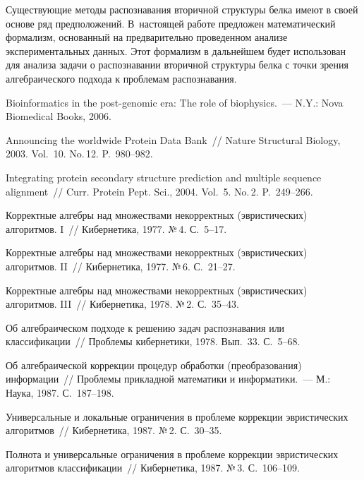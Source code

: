 \begin{multicols}{2}
Существующие методы распознавания вторичной структуры белка имеют в 
своей основе ряд предположений. В~настоящей работе предложен 
математический формализм, основанный на предварительно проведенном 
анализе экспериментальных данных. Этот формализм в дальнейшем будет 
использован для анализа задачи о распознавании вторичной структуры белка с 
точки зрения ал\-геб\-раи\-че\-ско\-го подхода к проблемам распознавания. 

{\small\frenchspacing
{\baselineskip=11.8pt
\begin{thebibliography}{99}

Bioinformatics in the post-genomic era: The role of biophysics.~--- N.Y.: Nova 
Biomedical Books, 2006. %

Announcing the worldwide Protein Data Bank~// Nature Structural Biology, 2003. 
Vol.~10. No.\,12. P.~980--982.

Integrating protein secondary structure prediction and multiple sequence alignment~// 
Curr. Protein Pept. Sci., 2004. Vol.~5. No.\,2. P.~249--266.

Корректные алгебры над множествами некорректных (эвристических) 
алгоритмов. I~// Кибернетика, 1977. №\,4. С.~5--17.

Корректные алгебры над множествами некорректных (эвристических) 
алгоритмов. II~// Кибернетика, 1977. №\,6. С.~21--27.

Корректные алгебры над множествами некорректных (эвристических) 
алгоритмов. III~// Кибернетика, 1978. №\,2. С.~35--43.

Об алгебраическом подходе к решению задач распознавания или 
классификации~// Проблемы кибернетики, 1978. Вып.~33. 
С.~5--68.

Об алгебраической коррекции процедур обработки (преобразования) 
информации~// Проблемы прикладной математики и информатики.~--- М.: Наука, 1987. С.~187--198.

Универсальные и локальные ограничения в проблеме коррекции эвристических 
алгоритмов~// Кибернетика, 1987. №\,2. С.~30--35.

Полнота и универсальные ограничения в проблеме коррекции эвристических 
алгоритмов классификации~// Кибернетика, 1987. №\,3. С.~106--109.


\end{thebibliography}}}
\end{multicols}
